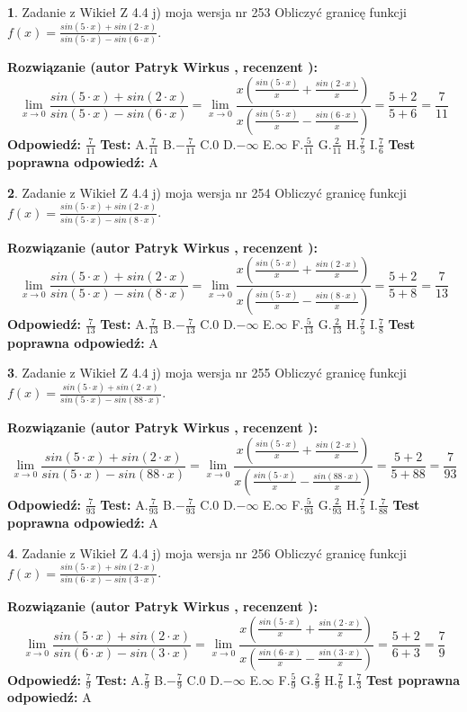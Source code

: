 \documentclass[12pt, a4paper]{article}
\theoremstyle{definition} %
\newtheorem{zad}{}
\newcommand{\zadStart}[1]{\begin{zad}#1\newline}
\newcommand{\zadStop}{\end{zad}}
\newcommand{\rozwStart}[2]{\noindent \textbf{Rozwiązanie (autor #1 , recenzent #2): }\newline}
\newcommand{\rozwStop}{\newline}
\newcommand{\odpStart}{\noindent \textbf{Odpowiedź:}\newline}
\newcommand{\odpStop}{\newline}
\newcommand{\testStart}{\noindent \textbf{Test:}\newline}
\newcommand{\testStop}{\newline}
\newcommand{\kluczStart}{\noindent \textbf{Test poprawna odpowiedź:}\newline}
\newcommand{\kluczStop}{\newline}
\begin{document}
\zadStart{Zadanie z Wikieł Z 4.4 j) moja wersja nr 253}
Obliczyć granicę funkcji $f(x)=\frac{sin(5\cdot x) +sin(2\cdot x)}{sin(5\cdot x) -sin(6\cdot x)}$.
\zadStop
\rozwStart{Patryk Wirkus}{}
$$\lim\limits_{x\to 0}\frac{sin(5\cdot x) +sin(2\cdot x)}{sin(5\cdot x) -sin(6\cdot x)}=\lim\limits_{x\to 0}\frac{x(\frac{sin(5\cdot x)}{x}+\frac{sin(2\cdot x)}{x})}{x(\frac{sin(5\cdot x)}{x}-\frac{sin(6\cdot x)}{x})}=\frac{5+2}{5+6} = \frac{7}{11}$$
\rozwStop
\odpStart
$\frac{7}{11}$
\odpStop
\testStart
A.$\frac{7}{11}$
B.$-\frac{7}{11}$
C.$0$
D.$-\infty$
E.$\infty$
F.$\frac{5}{11}$
G.$\frac{2}{11}$
H.$\frac{7}{5}$
I.$\frac{7}{6}$
\testStop
\kluczStart
A
\kluczStop



\zadStart{Zadanie z Wikieł Z 4.4 j) moja wersja nr 254}
Obliczyć granicę funkcji $f(x)=\frac{sin(5\cdot x) +sin(2\cdot x)}{sin(5\cdot x) -sin(8\cdot x)}$.
\zadStop
\rozwStart{Patryk Wirkus}{}
$$\lim\limits_{x\to 0}\frac{sin(5\cdot x) +sin(2\cdot x)}{sin(5\cdot x) -sin(8\cdot x)}=\lim\limits_{x\to 0}\frac{x(\frac{sin(5\cdot x)}{x}+\frac{sin(2\cdot x)}{x})}{x(\frac{sin(5\cdot x)}{x}-\frac{sin(8\cdot x)}{x})}=\frac{5+2}{5+8} = \frac{7}{13}$$
\rozwStop
\odpStart
$\frac{7}{13}$
\odpStop
\testStart
A.$\frac{7}{13}$
B.$-\frac{7}{13}$
C.$0$
D.$-\infty$
E.$\infty$
F.$\frac{5}{13}$
G.$\frac{2}{13}$
H.$\frac{7}{5}$
I.$\frac{7}{8}$
\testStop
\kluczStart
A
\kluczStop



\zadStart{Zadanie z Wikieł Z 4.4 j) moja wersja nr 255}
Obliczyć granicę funkcji $f(x)=\frac{sin(5\cdot x) +sin(2\cdot x)}{sin(5\cdot x) -sin(88\cdot x)}$.
\zadStop
\rozwStart{Patryk Wirkus}{}
$$\lim\limits_{x\to 0}\frac{sin(5\cdot x) +sin(2\cdot x)}{sin(5\cdot x) -sin(88\cdot x)}=\lim\limits_{x\to 0}\frac{x(\frac{sin(5\cdot x)}{x}+\frac{sin(2\cdot x)}{x})}{x(\frac{sin(5\cdot x)}{x}-\frac{sin(88\cdot x)}{x})}=\frac{5+2}{5+88} = \frac{7}{93}$$
\rozwStop
\odpStart
$\frac{7}{93}$
\odpStop
\testStart
A.$\frac{7}{93}$
B.$-\frac{7}{93}$
C.$0$
D.$-\infty$
E.$\infty$
F.$\frac{5}{93}$
G.$\frac{2}{93}$
H.$\frac{7}{5}$
I.$\frac{7}{88}$
\testStop
\kluczStart
A
\kluczStop



\zadStart{Zadanie z Wikieł Z 4.4 j) moja wersja nr 256}
Obliczyć granicę funkcji $f(x)=\frac{sin(5\cdot x) +sin(2\cdot x)}{sin(6\cdot x) -sin(3\cdot x)}$.
\zadStop
\rozwStart{Patryk Wirkus}{}
$$\lim\limits_{x\to 0}\frac{sin(5\cdot x) +sin(2\cdot x)}{sin(6\cdot x) -sin(3\cdot x)}=\lim\limits_{x\to 0}\frac{x(\frac{sin(5\cdot x)}{x}+\frac{sin(2\cdot x)}{x})}{x(\frac{sin(6\cdot x)}{x}-\frac{sin(3\cdot x)}{x})}=\frac{5+2}{6+3} = \frac{7}{9}$$
\rozwStop
\odpStart
$\frac{7}{9}$
\odpStop
\testStart
A.$\frac{7}{9}$
B.$-\frac{7}{9}$
C.$0$
D.$-\infty$
E.$\infty$
F.$\frac{5}{9}$
G.$\frac{2}{9}$
H.$\frac{7}{6}$
I.$\frac{7}{3}$
\testStop
\kluczStart
A
\kluczStop
\end{document}
